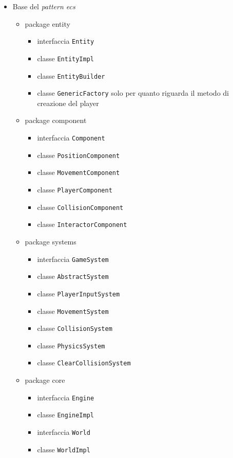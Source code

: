 \documentclass[a4paper,12pt]{report}
\begin{document}
\begin{itemize}
	\item Base del \textit{pattern ecs}
		\begin{itemize}
			\item package entity
				\begin{itemize}
					\item interfaccia \texttt{Entity}
					\item classe \texttt{EntityImpl}
					\item classe \texttt{EntityBuilder}
					\item classe \texttt{GenericFactory} solo per quanto riguarda il metodo di creazione del player
				\end{itemize}
			\item package component
				\begin{itemize}
					\item interfaccia \texttt{Component}
					\item classe \texttt{PositionComponent}
					\item classe \texttt{MovementComponent}
					\item classe \texttt{PlayerComponent}
					\item classe \texttt{CollisionComponent}
					\item classe \texttt{InteractorComponent}
				\end{itemize}
			\item package systems
				\begin{itemize}
					\item interfaccia \texttt{GameSystem}
					\item classe \texttt{AbstractSystem}
					\item classe \texttt{PlayerInputSystem}
					\item classe \texttt{MovementSystem}
					\item classe \texttt{CollisionSystem}
					\item classe \texttt{PhysicsSystem}
					\item classe \texttt{ClearCollisionSystem}
				\end{itemize}
			\item package core
				\begin{itemize}
					\item interfaccia \texttt{Engine}
					\item classe \texttt{EngineImpl}
					\item interfaccia \texttt{World}
					\item classe \texttt{WorldImpl}

\end{itemize}
\end{itemize}
\end{itemize}
\end{document}

